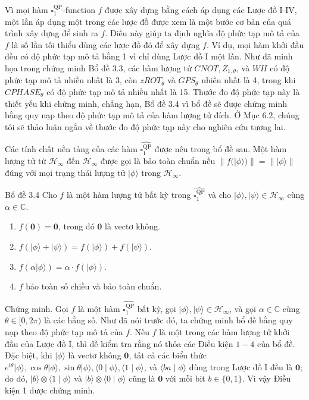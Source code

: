 \documentclass[10pt]{article}
\begin{document}
Vì mọi hàm $\square_{1}^{\mathrm{QP}}$-function $f$ được xây dựng bằng cách áp dụng các Lược đồ I-IV, một lần áp dụng một trong các lược đồ được xem là một bước cơ bản của quá trình xây dựng để sinh ra $f$. Điều này giúp ta định nghĩa độ phức tạp mô tả của $f$ là số lần tối thiểu dùng các lược đồ đó để xây dựng $f$. Ví dụ, mọi hàm khởi đầu đều có độ phức tạp mô tả bằng 1 vì chỉ dùng Lược đồ I một lần. Như đã minh họa trong chứng minh Bổ đề 3.3, các hàm lượng tử $C N O T, Z_{1, \theta}$, và $W H$ có độ phức tạp mô tả nhiều nhất là 3, còn $z R O T_{\theta}$ và $G P S_{\theta}$ nhiều nhất là 4, trong khi $C P H A S E_{\theta}$ có độ phức tạp mô tả nhiều nhất là 15. Thước đo độ phức tạp này là thiết yếu khi chứng minh, chẳng hạn, Bổ đề 3.4 vì bổ đề sẽ được chứng minh bằng quy nạp theo độ phức tạp mô tả của hàm lượng tử đích. Ở Mục 6.2, chúng tôi sẽ thảo luận ngắn về thước đo độ phức tạp này cho nghiên cứu tương lai.

Các tính chất nền tảng của các hàm $\widehat{\square_{1}^{\mathrm{QP}}}$ được nêu trong bổ đề sau. Một hàm lượng tử từ $\mathcal{H}_{\infty}$ đến $\mathcal{H}_{\infty}$ được gọi là bảo toàn chuẩn nếu $\| f(|\phi\rangle)\|=\||\phi\rangle \|$ đúng với mọi trạng thái lượng tử $|\phi\rangle$ trong $\mathcal{H}_{\infty}$.

Bổ đề 3.4 Cho $f$ là một hàm lượng tử bất kỳ trong $\widehat{\square_{1}^{\mathrm{QP}}}$ và cho $|\phi\rangle,|\psi\rangle \in \mathcal{H}_{\infty}$ cùng $\alpha \in \mathbb{C}$.

\begin{enumerate}
  \item $f(\mathbf{0})=\mathbf{0}$, trong đó $\mathbf{0}$ là vectơ không.
  \item $f(|\phi\rangle+|\psi\rangle)=f(|\phi\rangle)+f(|\psi\rangle)$.
  \item $f(\alpha|\phi\rangle)=\alpha \cdot f(|\phi\rangle)$.
  \item $f$ bảo toàn số chiều và bảo toàn chuẩn.
\end{enumerate}

Chứng minh. Gọi $f$ là một hàm $\widehat{\square_{1}^{\mathrm{QP}}}$ bất kỳ, gọi $|\phi\rangle,|\psi\rangle \in \mathcal{H}_{\infty}$, và gọi $\alpha \in \mathbb{C}$ cùng $\theta \in[0,2 \pi)$ là các hằng số. Như đã nói trước đó, ta chứng minh bổ đề bằng quy nạp theo độ phức tạp mô tả của $f$. Nếu $f$ là một trong các hàm lượng tử khởi đầu của Lược đồ I, thì dễ kiểm tra rằng nó thỏa các Điều kiện $1-4$ của bổ đề. Đặc biệt, khi $|\phi\rangle$ là vectơ không $\mathbf{0}$, tất cả các biểu thức $e^{i \theta}|\phi\rangle, \cos \theta|\phi\rangle, \sin \theta|\phi\rangle,\langle 0 \mid \phi\rangle,\langle 1 \mid \phi\rangle$, và $\langle b a \mid \phi\rangle$ dùng trong Lược đồ I đều là $\mathbf{0}$; do đó, $|b\rangle \otimes\langle 1 \mid \phi\rangle$ và $|b\rangle \otimes\langle 0 \mid \phi\rangle$ cũng là $\mathbf{0}$ với mỗi bit $b \in\{0,1\}$. Vì vậy Điều kiện 1 được chứng minh.
\end{document}
